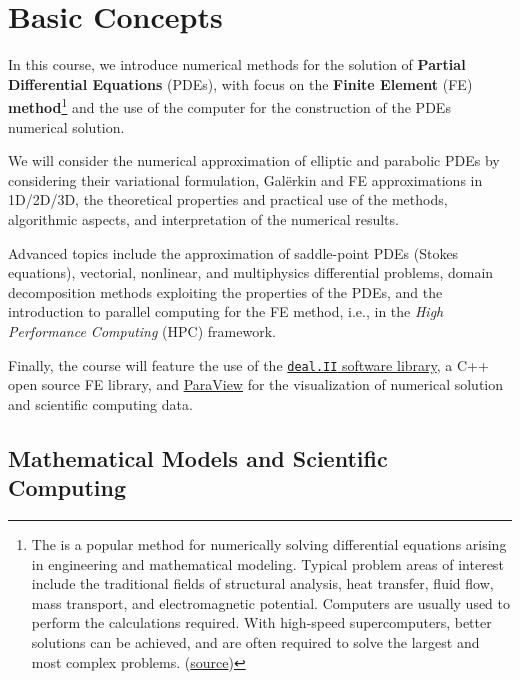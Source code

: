 \section{Basic Concepts}

In this course, we introduce numerical methods for the solution of \textbf{Partial Differential Equations} (PDEs), with focus on the \textbf{Finite Element} (FE) \textbf{method}\footnote{The \label{definition: Finite Element Method (FEM)} is a popular method for numerically solving differential equations arising in engineering and mathematical modeling. Typical problem areas of interest include the traditional fields of structural analysis, heat transfer, fluid flow, mass transport, and electromagnetic potential. Computers are usually used to perform the calculations required. With high-speed supercomputers, better solutions can be achieved, and are often required to solve the largest and most complex problems. (\href{https://en.wikipedia.org/wiki/Finite_element_method}{source})} and the use of the computer for the construction of the PDEs numerical solution.

\highspace
We will consider the numerical approximation of elliptic and parabolic PDEs by considering their variational formulation, Galërkin and FE approximations in 1D/2D/3D, the theoretical properties and practical use of the methods, algorithmic aspects, and interpretation of the numerical results.

\highspace
Advanced topics include the approximation of saddle-point PDEs (Stokes equations), vectorial, nonlinear, and multiphysics differential problems, domain decomposition methods exploiting the properties of the PDEs, and the introduction to parallel computing for the FE method, i.e., in the \emph{High Performance Computing} (HPC) framework.

\highspace
Finally, the course will feature the use of the \href{https://www.dealii.org/}{\texttt{deal.II} software library}, a C++ open source FE library, and \href{https://www.paraview.org/}{ParaView} for the visualization of numerical solution and scientific computing data.

\newpage

\subsection{Mathematical Models and Scientific Computing}


